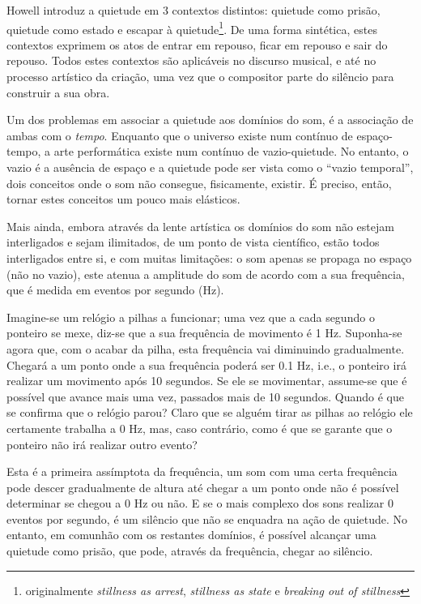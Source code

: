 \documentclass[../main.tex]{subfiles}
\begin{document}
Howell introduz a quietude em 3 contextos distintos: quietude como prisão, quietude como estado e escapar à quietude\footnote{originalmente \textsl{stillness as arrest}, \textsl{stillness as state} e \textsl{breaking out of stillness}}. De uma forma sintética, estes contextos exprimem os atos de entrar em repouso, ficar em repouso e sair do repouso. Todos estes contextos são aplicáveis no discurso musical, e até no processo artístico da criação, uma vez que o compositor parte do silêncio para construir a sua obra.

Um dos problemas em associar a quietude aos domínios do som, é a associação de ambas com o \textsl{tempo}. Enquanto que o universo existe num contínuo de espaço-tempo, a arte performática existe num contínuo de vazio-quietude\cite{howell1999}. No entanto, o vazio é a ausência de espaço e a quietude pode ser vista como o \enquote{vazio temporal}, dois conceitos onde o som não consegue, fisicamente, existir. É preciso, então, tornar estes conceitos um pouco mais elásticos.

Mais ainda, embora através da lente artística os domínios do som não estejam interligados e sejam ilimitados, de um ponto de vista científico, estão todos interligados entre si, e com muitas limitações: o som apenas se propaga no espaço (não no vazio), este atenua a amplitude do som de acordo com a sua frequência, que é medida em eventos por segundo (Hz). 


Imagine-se um relógio a pilhas a funcionar; uma vez que a cada segundo o ponteiro se mexe, diz-se que a sua frequência de movimento é 1 Hz. Suponha-se agora que, com o acabar da pilha, esta frequência vai diminuindo gradualmente. Chegará a um ponto onde a sua frequência poderá ser 0.1 Hz, i.e., o ponteiro irá realizar um movimento após 10 segundos. Se ele se movimentar, assume-se que é possível que avance mais uma vez, passados mais de 10 segundos. Quando é que se confirma que o relógio parou? Claro que se alguém tirar as pilhas ao relógio ele certamente trabalha a 0 Hz, mas, caso contrário, como é que se garante que o ponteiro não irá realizar outro evento?

Esta é a primeira assímptota da frequência, um som com uma certa frequência pode descer gradualmente de altura até chegar a um ponto onde não é possível determinar se chegou a 0 Hz ou não. E se o mais complexo dos sons realizar 0 eventos por segundo, é um silêncio que não se enquadra na ação de quietude. No entanto, em comunhão com os restantes domínios, é possível alcançar uma quietude como prisão, que pode, através da frequência, chegar ao silêncio.
\end{document}
